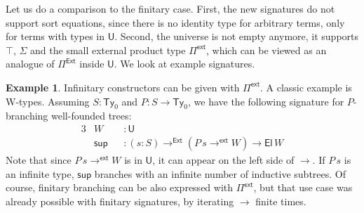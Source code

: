 \documentclass[12pt,a4paper,twoside,openany]{book}
\theoremstyle{remark}
\theoremstyle{definition}
\newtheorem{myexample}{Example}
\theoremstyle{theorem}
\newcommand{\ms}[1]{\mathsf{#1}}
\newcommand{\Ty}{\mathsf{Ty}}
\newcommand{\U}{\mathsf{U}}
\newcommand{\El}{\mathsf{El}}
\newcommand{\Pie}{\Pi^{\mathsf{Ext}}}
\newcommand{\toe}{\to^{\ms{Ext}}}
\newcommand{\Piinf}{\Pi^{\mathsf{ext}}}
\newcommand{\toinf}{\to^{\ms{ext}}}
\begin{document}
Let us do a comparison to the finitary case. First, the new signatures do not
support sort equations, since there is no identity type for arbitrary terms,
only for terms with types in $\U$. Second, the universe is not empty anymore, it
supports $\top$, $\Sigma$ and the small external product type $\Piinf$, which
can be viewed as an analogue of $\Pie$ inside $\U$. We look at example
signatures.

\begin{myexample}
Infinitary constructors can be given with $\Piinf$. A classic example is
W-types. Assuming $S : \Ty_0$ and $P : S \to \Ty_0$, we have the following
signature for $P$-branching well-founded trees:
\begin{alignat*}{3}
  &W &&: \U\\
  &\ms{sup} &&: (s : S) \toe (P\,s \toinf W) \to \El\,W
\end{alignat*}
Note that since $P\,s \toinf W$ is in $\U$, it can appear on the left side of
$\to$. If $P\,s$ is an infinite type, $\ms{sup}$ branches with an infinite
number of inductive subtrees. Of course, finitary branching can be also
expressed with $\Piinf$, but that use case was already possible with finitary
signatures, by iterating $\to$ finite times.
\end{myexample}
\end{document}

